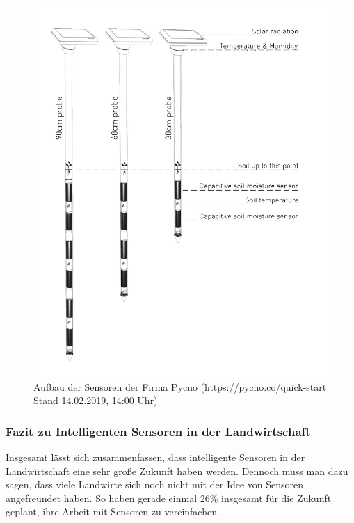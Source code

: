 \documentclass[a4paper,12pt]{scrartcl}
\begin{document}
\begin{figure}[H]
\centering
\includegraphics[scale=0.4]{picture/pycno}
\caption{Aufbau der Sensoren der Firma Pycno (https://pycno.co/quick-start Stand 14.02.2019, 14:00 Uhr)}
\label{fig:Aufbau der Sensoren der Firma Pycno}
\end{figure}

\newpage
\subsubsection{Fazit zu Intelligenten Sensoren in der Landwirtschaft}
Insgesamt lässt sich zusammenfassen, dass intelligente Sensoren in der Landwirtschaft eine sehr große Zukunft haben werden. Dennoch muss man dazu sagen, dass viele Landwirte sich noch nicht mit der Idee von Sensoren angefreundet haben. So haben gerade einmal 26\% insgesamt für die Zukunft geplant, ihre Arbeit mit Sensoren zu vereinfachen.
\end{document}
